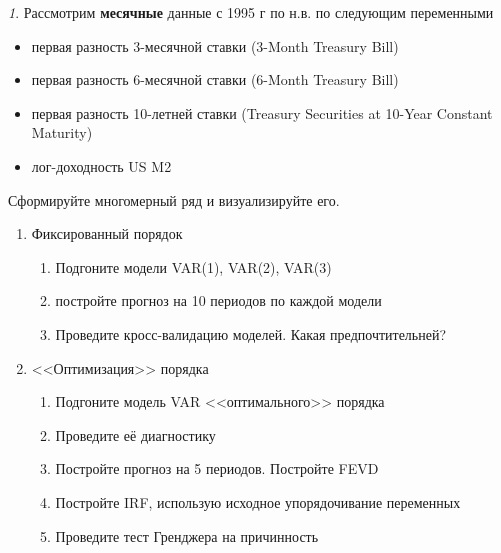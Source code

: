\documentclass[12pt]{article}
\theoremstyle{remark}
\newtheorem{exercise}{}[subsection]
\begin{document}
\begin{exercise}
Рассмотрим \textbf{месячные} данные с 1995 г по н.в. по следующим переменными
\begin{itemize}
	\item первая разность 3-месячной ставки (3-Month Treasury Bill)
	\item первая разность 6-месячной ставки (6-Month Treasury Bill)
	\item первая разность 10-летней ставки (Treasury Securities at 10-Year Constant Maturity)
	\item лог-доходность US M2
\end{itemize}
Сформируйте многомерный ряд и визуализируйте его.
\begin{enumerate}
	\item Фиксированный порядок
	\begin{enumerate}
		\item Подгоните модели VAR(1), VAR(2), VAR(3)
		\item постройте прогноз на 10 периодов по каждой модели
		\item Проведите кросс-валидацию моделей. Какая предпочтительней?
	\end{enumerate}
	\item <<Оптимизация>> порядка
	\begin{enumerate}
		\item Подгоните модель VAR <<оптимального>> порядка
		\item Проведите её диагностику
		\item Постройте прогноз на 5 периодов. Постройте FEVD
		\item Постройте IRF, использую исходное упорядочивание переменных
		\item Проведите тест Гренджера на причинность
	\end{enumerate}
\end{enumerate}
\end{exercise}
\end{document}
